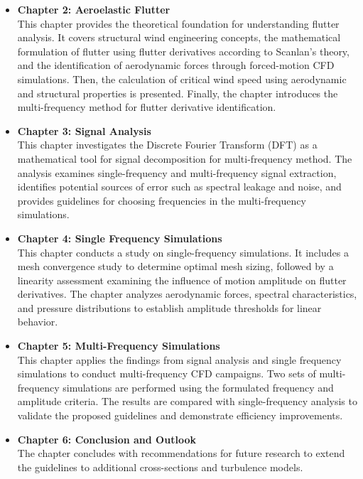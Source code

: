 \documentclass[../main]{subfiles}
\begin{document}
\begin{itemize}
    \item \textbf{Chapter 2: Aeroelastic Flutter} \\
    This chapter provides the theoretical foundation for understanding flutter analysis. It covers structural wind engineering concepts, 
    the mathematical formulation of flutter using flutter derivatives according to Scanlan's theory, and the identification of aerodynamic forces 
    through forced-motion CFD simulations. Then, the calculation of critical wind speed using aerodynamic and structural properties is presented.
    Finally, the chapter introduces the multi-frequency method for flutter derivative identification.

    \item \textbf{Chapter 3: Signal Analysis} \\
    This chapter investigates the Discrete Fourier Transform (DFT) as a mathematical tool for signal decomposition for multi-frequency method. 
    The analysis examines single-frequency and multi-frequency signal extraction, identifies potential sources of error such as spectral leakage 
    and noise, and provides guidelines for choosing frequencies in the multi-frequency simulations. 

    \item \textbf{Chapter 4: Single Frequency Simulations} \\
    This chapter conducts a study on single-frequency simulations. It includes a mesh convergence study to determine optimal mesh sizing, 
    followed by a linearity assessment examining the influence of motion amplitude on flutter derivatives. The chapter analyzes aerodynamic forces, 
    spectral characteristics, and pressure distributions to establish amplitude thresholds for linear behavior.

    \item \textbf{Chapter 5: Multi-Frequency Simulations} \\
    This chapter applies the findings from signal analysis and single frequency simulations to conduct multi-frequency CFD campaigns. 
    Two sets of multi-frequency simulations are performed using the formulated frequency and amplitude criteria. The results are compared 
    with single-frequency analysis to validate the proposed guidelines and demonstrate efficiency improvements.

    \item \textbf{Chapter 6: Conclusion and Outlook} \\
    The chapter concludes with recommendations for 
    future research to extend the guidelines to additional cross-sections and turbulence models.

\end{itemize}
\end{document}

